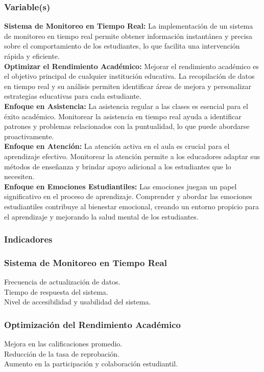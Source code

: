 \documentclass[12pt]{article}
\begin{document}
\subsubsection{Variable(s)}
\textbf{Sistema de Monitoreo en Tiempo Real:} La implementación de un sistema de monitoreo en tiempo real permite obtener información instantánea y precisa sobre el comportamiento de los estudiantes, lo que facilita una intervención rápida y eficiente.\\
\textbf{Optimizar el Rendimiento Académico:} Mejorar el rendimiento académico es el objetivo principal de cualquier institución educativa. La recopilación de datos en tiempo real y su análisis permiten identificar áreas de mejora y personalizar estrategias educativas para cada estudiante.\\
\textbf{Enfoque en Asistencia:} La asistencia regular a las clases es esencial para el éxito académico. Monitorear la asistencia en tiempo real ayuda a identificar patrones y problemas relacionados con la puntualidad, lo que puede abordarse proactivamente.\\
\textbf{Enfoque en Atención:} La atención activa en el aula es crucial para el aprendizaje efectivo. Monitorear la atención permite a los educadores adaptar sus métodos de enseñanza y brindar apoyo adicional a los estudiantes que lo necesiten.\\
\textbf{Enfoque en Emociones Estudiantiles:} Las emociones juegan un papel significativo en el proceso de aprendizaje. Comprender y abordar las emociones estudiantiles contribuye al bienestar emocional, creando un entorno propicio para el aprendizaje y mejorando la salud mental de los estudiantes.
\subsubsection{Indicadores}
\subsubsection*{Sistema de Monitoreo en Tiempo Real}
Frecuencia de actualización de datos.\\
Tiempo de respuesta del sistema.\\
Nivel de accesibilidad y usabilidad del sistema.
\subsubsection*{Optimización del Rendimiento Académico}
Mejora en las calificaciones promedio.\\
Reducción de la tasa de reprobación.\\
Aumento en la participación y colaboración estudiantil.
\end{document}
